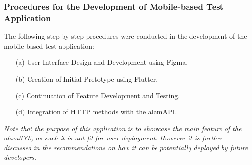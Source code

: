 \subsubsection{Procedures for the Development of Mobile-based Test Application}
\label{subsubsec:proc_mobdev}
The following step-by-step procedures were conducted in the development
of the mobile-based test application:
\begin{itemize}
    \item[(a)] User Interface Design and Development using Figma.
    \item[(b)] Creation of Initial Prototype using Flutter.
    \item[(c)] Continuation of Feature Development and Testing.
    \item[(d)] Integration of HTTP methods with the alamAPI.
\end{itemize}

\textit{Note that the purpose of this application is to showcase the main feature of
the alamSYS, as such it is not fit for user deployment. However it is further discussed
in the recommendations on how it can be potentially deployed by future developers.}

